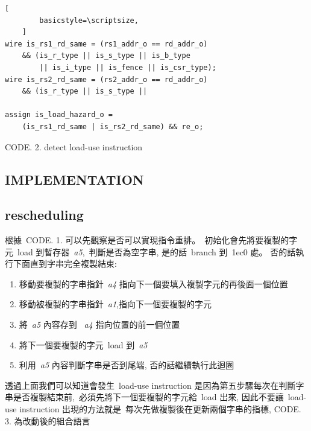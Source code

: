 \documentclass{article}
\begin{document}
\begin{CJK*}{UTF8}{bsmi}
\begin{multicols}{2}
\begin{center}
    \begin{lstlisting}[
        basicstyle=\scriptsize, 
    ]
wire is_rs1_rd_same = (rs1_addr_o == rd_addr_o) 
    && (is_r_type || is_s_type || is_b_type 
        || is_i_type || is_fence || is_csr_type);
wire is_rs2_rd_same = (rs2_addr_o == rd_addr_o)
    && (is_r_type || is_s_type ||

assign is_load_hazard_o = 
    (is_rs1_rd_same | is_rs2_rd_same) && re_o;
    \end{lstlisting}
    \small CODE. 2. detect load-use instruction
\end{center}

\newpage

\begin{center}
    \section*{IMPLEMENTATION}    
    \subsection*{rescheduling}
\end{center}
\begin{flushleft}
    根據\ CODE. 1. 可以先觀察是否可以實現指令重排。\
    初始化會先將要複製的字元\ load 到暫存器\ \textit{a5},\
    判斷是否為空字串, 是的話\ branch 到\ 1ec0 處。\newline
    否的話執行下面直到字串完全複製結束:\newline
    \begin{enumerate}
        \item 移動要複製的字串指針\ \textit{a4} 指向下一個要填入複製字元的再後面一個位置\
        \item 移動被複製的字串指針\ \textit{a1},指向下一個要複製的字元\
        \item 將\ \textit{a5} 內容存到 \ \textit{a4} 指向位置的前一個位置\
        \item 將下一個要複製的字元\ load 到\ \textit{a5}\
        \item 利用\ \textit{a5} 內容判斷字串是否到尾端, 否的話繼續執行此迴圈\newline
    \end{enumerate}
    
    透過上面我們可以知道會發生\ load-use instruction 是因為第五步驟每次在判斷字串是否複製結束前,\
    必須先將下一個要複製的字元給\ load 出來, 因此不要讓\ load-use instruction 出現的方法就是\
    每次先做複製後在更新兩個字串的指標, CODE. 3. 為改動後的組合語言\newline


\end{flushleft}
\end{multicols}
\end{CJK*}
\end{document}
